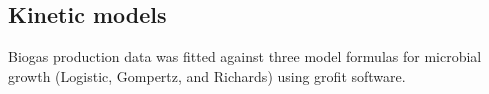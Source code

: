 \subsection{Kinetic models}
Biogas production data was fitted against three model formulas for microbial growth (Logistic, Gompertz, and Richards) using grofit software. 